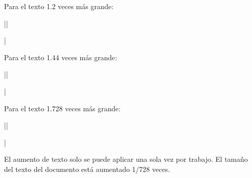 


\bigskip


\respuesta{}

\noindent Para el texto 1.2 veces m\'as grande:

||

|

\noindent Para el texto 1.44 veces m\'as grande:

||

|

\noindent Para el texto 1.728 veces m\'as grande:

||

|

\noindent El aumento de texto solo se puede aplicar una sola vez por trabajo. El tama\~no del texto del documento est\'a aumentado 1/728 veces.

\bigskip




\bye

